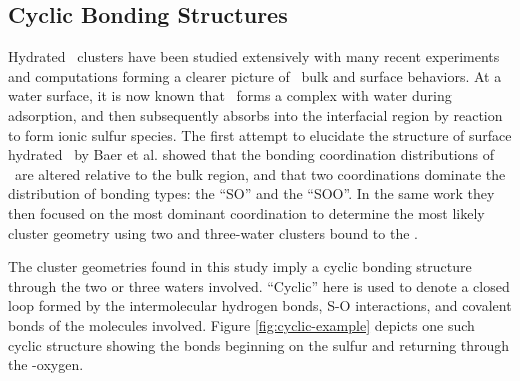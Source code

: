 \subsection {Cyclic Bonding Structures}

Hydrated \suldiox~clusters have been studied extensively with many recent experiments and computations forming a clearer picture of \suldiox~bulk and surface behaviors.\cite{Baer2010, Tarbuck2005, Tarbuck2006, Ota2011, Bishenden1998, Hirabayashi2006, Steudel2009, Yang2002, Hayashi1985, Moin2011, Eckl2008} At a water surface, it is now known that \suldiox~forms a complex with water during adsorption, and then subsequently absorbs into the interfacial region by reaction to form ionic sulfur species.\cite{Tarbuck2005, Tarbuck2006, Ota2011} The first attempt to elucidate the structure of surface hydrated \suldiox~by Baer et al. showed that the bonding coordination distributions of \suldiox~are altered relative to the bulk region, and that two coordinations dominate the distribution of bonding types: the ``SO'' and the ``SOO''. In the same work they then focused on the most dominant coordination to determine the most likely cluster geometry using two and three-water clusters bound to the \suldiox.

The cluster geometries found in this study imply a cyclic bonding structure through the two or three waters involved. ``Cyclic'' here is used to denote a closed loop formed by the intermolecular hydrogen bonds, S-O interactions, and covalent bonds of the molecules involved. Figure \ref{fig:cyclic-example} depicts one such cyclic structure showing the bonds beginning on the sulfur and returning through the \suldiox-oxygen.

